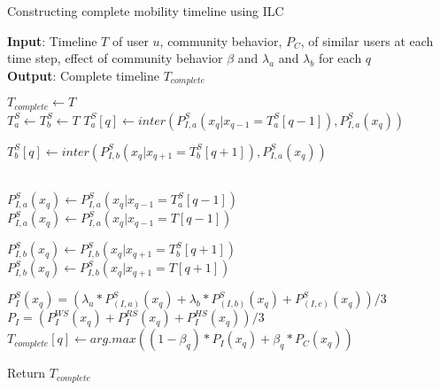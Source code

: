 \begin{algorithm}
\caption{Constructing complete mobility timeline using ILC}
\label{algo}
\begin{flushleft}
\textbf{Input}: Timeline $T$ of user $u$, community behavior, $P_C$, of similar users at each time step, effect of community behavior $\beta$ and $\lambda_a$ and $\lambda_b$ for each $q$\\
\textbf{Output}: Complete timeline $T_{complete}$
\end{flushleft}
\begin{algorithmic}[1]

\State $T_{complete} \leftarrow T$
\\
    \State $T_a^S \leftarrow T_b^S \leftarrow T$
        \State $T_a^S[q] \leftarrow inter(P_{I,a}^S{(x_{q}|x_{q-1}=T_a^S[q-1])},P_{I,a}^S(x_{q}))$
        
        
        \EndIf
    
    \EndFor
    
        \State $T_b^S[q] \leftarrow inter(P_{I,b}^S{(x_{q}|x_{q+1}=T_b^S[q+1])},P_{I,a}^S(x_{q}))$
        
        
        \EndIf
    
    \EndFor
    
    
\EndFor
\\
                \State $P_{I,a}^S(x_q) \leftarrow P_{I,a}^S{(x_{q}|x_{q-1}=T_a^S[q-1])}$
            \Else
                \State $P_{I,a}^S(x_q) \leftarrow P_{I,a}^S{(x_{q}|x_{q-1}=T[q-1])}$
            \EndIf
            
                \State $P_{I,b}^S(x_q) \leftarrow P_{I,b}^S{(x_{q}|x_{q+1}=T_b^S[q+1])}$
            \Else
                \State $P_{I,b}^S(x_q) \leftarrow P_{I,b}^S{(x_{q}|x_{q+1}=T[q+1])}$
            \EndIf
            
            \State $P_I^{S}(x_q)=(\lambda_a*P_{(I,a)}^{S}(x_q)+\lambda_b*P_{(I,b)}^{S}(x_q)+P_{(I,c)}^{S}(x_q))/3$
        \EndFor
        \State $P_I= (P_I^{WS}(x_q)+P_I^{RS}(x_q)+P_I^{HS}(x_q)) / 3$
        \State $T_{complete}[q] \leftarrow arg.max((1-\beta_q)*P_I(x_q) + \beta_q*P_C(x_q)) $
    \EndIf
\EndFor

Return $T_{complete}$
\end{algorithmic}
\end{algorithm}


